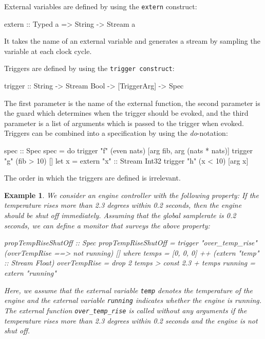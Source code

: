 \documentclass[]{article}
\theoremstyle{example}
\newtheorem{example}{Example}
\begin{document}
External variables are defined by using the {\tt extern} construct:
%
\begin{code}
extern :: Typed a => String -> Stream a
\end{code}
%
It takes the name of an external variable and generates a stream by sampling
the variable at each clock cycle.

Triggers are defined by using the {\tt trigger construct}:
%
\begin{code}
trigger :: String -> Stream Bool -> [TriggerArg] -> Spec
\end{code}
%
The first parameter is the name of the external function, the second parameter is the
guard which determines when the trigger should be evoked, and the third parameter
is a list of arguments which is passed to the trigger when evoked.
Triggers can be combined into a specification by using the \emph{do}-notation:
%
\begin{code}
spec :: Spec
spec = do
  trigger "f" (even nats) [arg fib, arg (nats * nats)]
  trigger "g" (fib > 10) []
  let x = extern "x" :: Stream Int32
  trigger "h" (x < 10) [arg x]
\end{code}
%
The order in which the triggers are defined is irrelevant.

\begin{example}
\label{exm:engine}
We consider an engine controller with the following property:
If the temperature rises more than 2.3 degrees within 0.2 seconds, then
the engine should be shut off immediately.
Assuming that the global samplerate is 0.2 seconds, we can define a monitor that
surveys the above property:
%
\begin{code}
propTempRiseShutOff :: Spec
propTempRiseShutOff = trigger "over_temp_rise" (overTempRise ==> not running) []
  where
  temps        = [0, 0, 0] ++ (extern "temp" :: Stream Float)
  overTempRise = drop 2 temps > const 2.3 + temps
  running      = extern "running"

\end{code}
%
Here, we assume that the external variable {\tt temp} denotes the temperature of the
engine and the external variable {\tt running} indicates whether the engine is running.
The external function {\tt over\_temp\_rise} is called without any arguments if the
temperature rises more than 2.3 degrees within 0.2 seconds and the engine is not shut
off.
\end{example}
\end{document}
